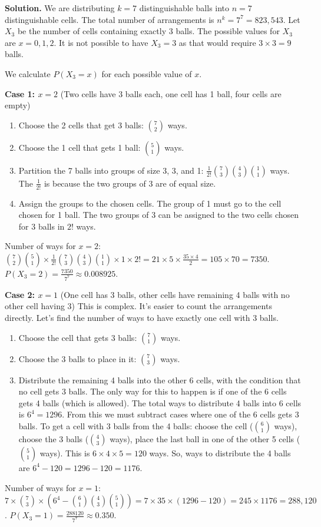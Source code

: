 \noindent\textbf{Solution.}
We are distributing $k=7$ distinguishable balls into $n=7$ distinguishable cells. The total number of arrangements is $n^k = 7^7 = 823,543$.
Let $X_3$ be the number of cells containing exactly 3 balls. The possible values for $X_3$ are $x=0, 1, 2$. It is not possible to have $X_3=3$ as that would require $3 \times 3 = 9$ balls.

We calculate $P(X_3=x)$ for each possible value of $x$.

\textbf{Case 1: $x=2$} (Two cells have 3 balls each, one cell has 1 ball, four cells are empty)
\begin{enumerate}
    \item Choose the 2 cells that get 3 balls: $\binom{7}{2}$ ways.
    \item Choose the 1 cell that gets 1 ball: $\binom{5}{1}$ ways.
    \item Partition the 7 balls into groups of size 3, 3, and 1: $\frac{1}{2!}\binom{7}{3}\binom{4}{3}\binom{1}{1}$ ways. The $\frac{1}{2!}$ is because the two groups of 3 are of equal size.
    \item Assign the groups to the chosen cells. The group of 1 must go to the cell chosen for 1 ball. The two groups of 3 can be assigned to the two cells chosen for 3 balls in $2!$ ways.
\end{enumerate}
Number of ways for $x=2$: $\binom{7}{2}\binom{5}{1} \times \frac{1}{2!}\binom{7}{3}\binom{4}{3}\binom{1}{1} \times 1 \times 2! = 21 \times 5 \times \frac{35 \times 4}{2} = 105 \times 70 = 7350$.
$P(X_3=2) = \frac{7350}{7^7} \approx 0.008925$.

\textbf{Case 2: $x=1$} (One cell has 3 balls, other cells have remaining 4 balls with no other cell having 3)
This is complex. It's easier to count the arrangements directly.
Let's find the number of ways to have exactly one cell with 3 balls.
\begin{enumerate}
    \item Choose the cell that gets 3 balls: $\binom{7}{1}$ ways.
    \item Choose the 3 balls to place in it: $\binom{7}{3}$ ways.
    \item Distribute the remaining 4 balls into the other 6 cells, with the condition that no cell gets 3 balls. The only way for this to happen is if one of the 6 cells gets 4 balls (which is allowed). The total ways to distribute 4 balls into 6 cells is $6^4=1296$. From this we must subtract cases where one of the 6 cells gets 3 balls.
        To get a cell with 3 balls from the 4 balls: choose the cell ($\binom{6}{1}$ ways), choose the 3 balls ($\binom{4}{3}$ ways), place the last ball in one of the other 5 cells ($\binom{5}{1}$ ways). This is $6 \times 4 \times 5 = 120$ ways.
        So, ways to distribute the 4 balls are $6^4 - 120 = 1296 - 120 = 1176$.
\end{enumerate}
Number of ways for $x=1$: $7 \times \binom{7}{3} \times (6^4 - \binom{6}{1}\binom{4}{3}\binom{5}{1}) = 7 \times 35 \times (1296 - 120) = 245 \times 1176 = 288,120$.
$P(X_3=1) = \frac{288120}{7^7} \approx 0.350$.

